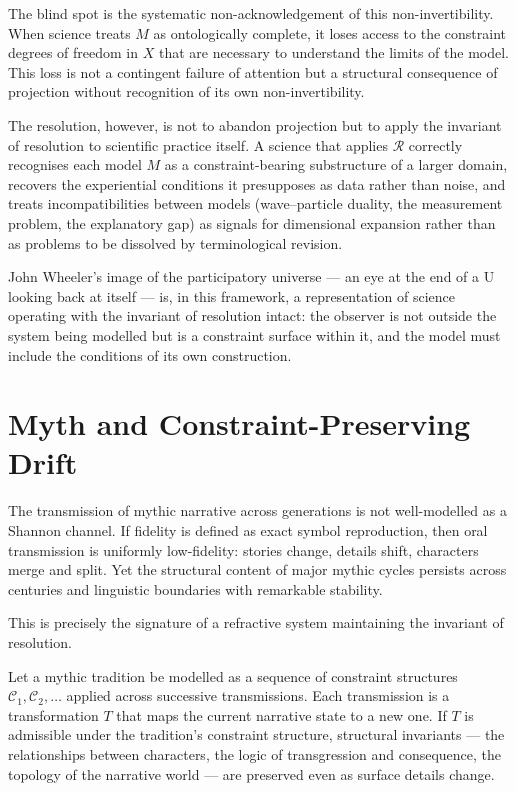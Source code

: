\documentclass[11pt,openany]{book}
\begin{document}
The blind spot is the systematic non-acknowledgement of
this non-invertibility.  When science treats $M$ as
ontologically complete, it loses access to the constraint
degrees of freedom in $X$ that are necessary to understand
the limits of the model.  This loss is not a contingent
failure of attention but a structural consequence of
projection without recognition of its own non-invertibility.

The resolution, however, is not to abandon projection but
to apply the invariant of resolution to scientific practice
itself.  A science that applies $\mathcal{R}$ correctly
recognises each model $M$ as a constraint-bearing
substructure of a larger domain, recovers the experiential
conditions it presupposes as data rather than noise, and
treats incompatibilities between models (wave--particle
duality, the measurement problem, the explanatory gap) as
signals for dimensional expansion rather than as problems
to be dissolved by terminological revision.

John Wheeler's image of the participatory universe ---
an eye at the end of a U looking back at itself
\citep{thompson2023blindspot} --- is, in this framework,
a representation of science operating with the invariant of
resolution intact: the observer is not outside the system
being modelled but is a constraint surface within it, and
the model must include the conditions of its own
construction.

\section{Myth and Constraint-Preserving Drift}
\label{sec:myth}

The transmission of mythic narrative across generations is
not well-modelled as a Shannon channel.  If fidelity is
defined as exact symbol reproduction, then oral transmission
is uniformly low-fidelity: stories change, details shift,
characters merge and split.  Yet the structural content of
major mythic cycles persists across centuries and linguistic
boundaries with remarkable stability.

This is precisely the signature of a refractive system
maintaining the invariant of resolution.

Let a mythic tradition be modelled as a sequence of
constraint structures $\mathcal{C}_1, \mathcal{C}_2,
\ldots$ applied across successive transmissions.  Each
transmission is a transformation $T$ that maps the current
narrative state to a new one.  If $T$ is admissible under
the tradition's constraint structure, structural invariants
--- the relationships between characters, the logic of
transgression and consequence, the topology of the
narrative world --- are preserved even as surface details
change.
\end{document}
